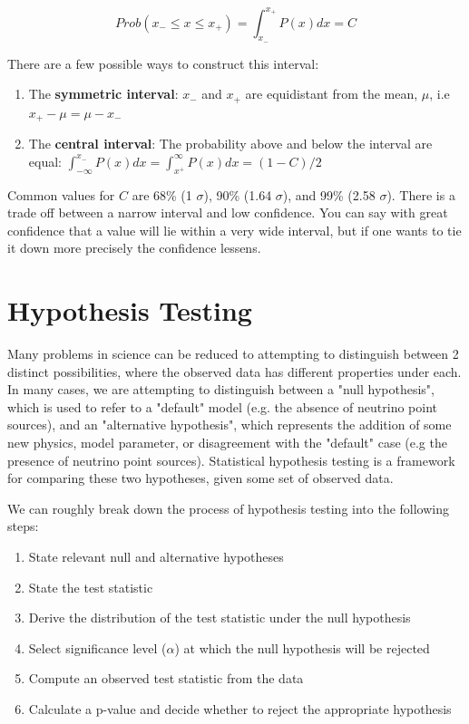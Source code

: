 \begin{equation}
    Prob(x_- \leq x \leq x_+) = \int_{x_-}^{x_+}P(x)dx = C
    \label{confidenceinterval}
\end{equation}

There are a few possible ways to construct this interval:

\begin{enumerate}
    \item The \textbf{symmetric interval}: $x_-$ and $x_+$ are equidistant from the mean, $\mu$, i.e $x_+ - \mu = \mu - x_-$
    \item The \textbf{central interval}: The probability above and below the interval are equal: $\int_{-\infty}^{x_-} P(x)dx = \int_{x^+}^{\infty} P(x)dx = (1-C)/2$
\end{enumerate}

Common values for $C$ are 68\% (1 $\sigma$), 90\% (1.64 $\sigma$), and 99\% (2.58 $\sigma$). There is a trade off between a narrow interval and low confidence. You can say with great confidence that a value will lie within a very wide interval, but if one wants to tie it down more precisely the confidence lessens. 

\section{Hypothesis Testing}
Many problems in science can be reduced to attempting to distinguish between 2 distinct possibilities, where the observed data has different properties under each. In many cases, we are attempting to distinguish between a "null hypothesis", which is used to refer to a "default" model (e.g. the absence of neutrino point sources), and an "alternative hypothesis", which represents the addition of some new physics, model parameter, or disagreement with the "default" case (e.g the presence of neutrino point sources). Statistical hypothesis testing is a framework for comparing these two hypotheses, given some set of observed data.

We can roughly break down the process of hypothesis testing into the following steps:

\begin{enumerate}
    \item State relevant null and alternative hypotheses
    \item State the test statistic
    \item Derive the distribution of the test statistic under the null hypothesis
    \item Select significance level ($\alpha$) at which the null hypothesis will be rejected
    \item Compute an observed test statistic from the data
    \item Calculate a p-value and decide whether to reject the appropriate hypothesis
\end{enumerate}

